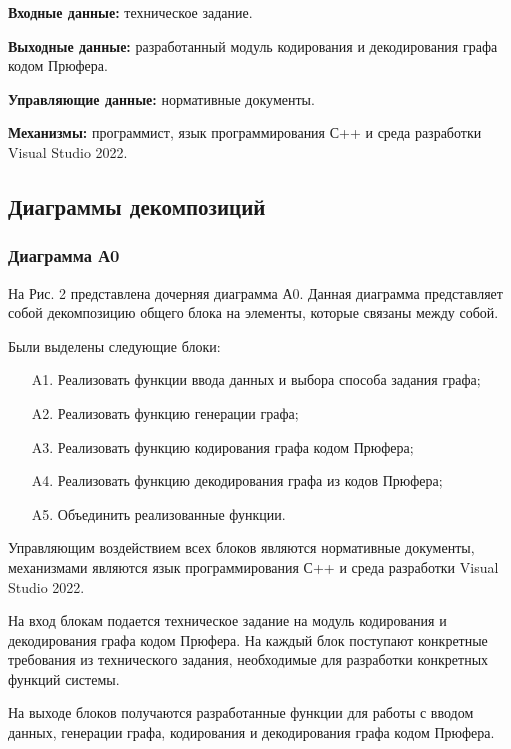 \documentclass[a4paper, final]{article}
\begin{document}
\par {\bf Входные данные:} техническое задание.

\par {\bf Выходные данные:} разработанный модуль кодирования и декодирования графа кодом Прюфера.

\par {\bf Управляющие данные:} нормативные документы.

\par {\bf Механизмы:} программист, язык программирования С++ и среда разработки Visual Studio 2022. 

\newpage
\hypertarget{img:A-0}{}



\subsection{Диаграммы декомпозиций}
\subsubsection{Диаграмма А0}

На Рис. 2 представлена дочерняя диаграмма А0. Данная диаграмма представляет собой декомпозицию общего блока на 
элементы, которые связаны между собой.

Были выделены следующие блоки:

\begin{itemize}
	\item[A1.] Реализовать функции ввода данных и выбора способа задания графа;
	\item[A2.] Реализовать функцию генерации графа;
	\item[A3.] Реализовать функцию кодирования графа кодом Прюфера;
	\item[A4.] Реализовать функцию декодирования графа из кодов Прюфера;
	\item[A5.] Объединить реализованные функции.
\end{itemize} 

Управляющим воздействием всех блоков являются нормативные документы, механизмами являются язык программирования С++ 
и среда разработки Visual Studio 2022.

На вход блокам подается техническое задание на модуль кодирования и декодирования графа кодом Прюфера. На каждый 
блок поступают конкретные требования из технического задания, необходимые для разработки конкретных функций системы.

На выходе блоков получаются разработанные функции для работы с вводом данных, генерации графа, кодирования и декодирования
графа кодом Прюфера.
\end{document}
